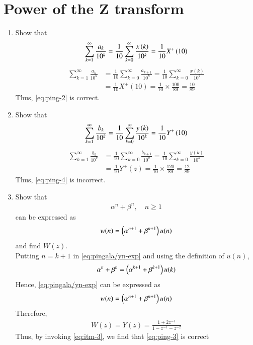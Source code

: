 \documentclass[journal,12pt,twocolumn]{IEEEtran}
\renewcommand\thesection{\arabic{section}}
\begin{document}
\section{Power of the Z transform}
\begin{enumerate}[label=\thesection.\arabic*,ref=\thesection.\theenumi]
\item Show that 
\begin{align}
	\sum_{k=1}^{\infty}\frac{a_k}{10^k}= 
	\frac{1}{10}\sum_{k=0}^{\infty}\frac{x\left(k\right)}{10^k} =\frac{1}{10}X^{+}\left({10}\right)
\end{align}
\label{pr:1-2}
\solution 
\begin{align}
    \sum_{k=1}^{\infty}\frac{a_k}{10^k} &= \frac{1}{10}\sum_{k = 0}^{\infty}\frac{a_{k+1}}{10^k} 
                                        = \frac{1}{10}\sum_{k = 0}^{\infty}\frac{x(k)}{10^k} \\
                                        &= \frac{1}{10}X^+(10) 
                                        = \frac{1}{10}\times\frac{100}{89} = \frac{10}{89}
\end{align}
Thus,
\eqref{eq:ping-2} is correct.
 \item Show that 
\begin{align}
	\sum_{k=1}^{\infty}\frac{b_k}{10^k} =
	\frac{1}{10}\sum_{k=0}^{\infty}\frac{y\left(k\right)}{10^k} =\frac{1}{10}Y^{+}\left({10}\right)
\end{align}
\label{pr:1-4}
\solution
\begin{align}
    \sum_{k=1}^{\infty}\frac{b_k}{10^k} &= \frac{1}{10}\sum_{k = 0}^{\infty}\frac{b_{k+1}}{10^k} 
                                        = \frac{1}{10}\sum_{k = 0}^{\infty}\frac{y(k)}{10^k} \\
                                        &= \frac{1}{10}Y^+(z) 
                                        = \frac{1}{10}\times\frac{120}{89} = \frac{12}{89}
\end{align}
Thus,
\eqref{eq:ping-4} is incorrect.
\item Show that 
\begin{align}
	\alpha^n + \beta^n, \quad n \ge 1
    \label{eq:pingala/yn-exp}
\end{align}
can be expressed as 
\begin{align}
	w(n) = \left(\alpha^{n+1} + \beta^{n+1}\right)u(n)
\end{align}
and find $W(z)$.
\\
\solution Putting $n = k + 1$ in \eqref{eq:pingala/yn-exp} and using the definition of $u(n)$, 
\begin{align}
\alpha^n + \beta^n = \left(\alpha^{k + 1} + \beta^{k + 1}\right)u(k)
\end{align}
Hence, \eqref{eq:pingala/yn-exp} can be expressed as
\begin{align}
w(n) = \left(\alpha^{n+1} + \beta^{n+1}\right)u(n) 
\end{align}
Therefore,
\begin{align}
    W(z) = Y(z) = \frac{1 + 2z^{-1}}{1 - z^{-1} - z^{-2}}
\end{align}
Thus, by invoking 
	\eqref{eq:itm-3},
we find that 
\eqref{eq:ping-3}
is correct 
\end{enumerate}
\end{document}

